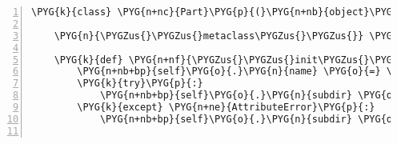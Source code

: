 \begin{Verbatim}[commandchars=\\\{\},numbers=left,firstnumber=1,stepnumber=5]
\PYG{k}{class} \PYG{n+nc}{Part}\PYG{p}{(}\PYG{n+nb}{object}\PYG{p}{)}\PYG{p}{:}

    \PYG{n}{\PYGZus{}\PYGZus{}metaclass\PYGZus{}\PYGZus{}} \PYG{o}{=} \PYG{n}{PartType}

    \PYG{k}{def} \PYG{n+nf}{\PYGZus{}\PYGZus{}init\PYGZus{}\PYGZus{}}\PYG{p}{(}\PYG{n+nb+bp}{self}\PYG{p}{)}\PYG{p}{:}
        \PYG{n+nb+bp}{self}\PYG{o}{.}\PYG{n}{name} \PYG{o}{=} \PYG{n+nb+bp}{self}\PYG{o}{.}\PYG{n}{\PYGZus{}\PYGZus{}class\PYGZus{}\PYGZus{}}\PYG{o}{.}\PYG{n}{\PYGZus{}\PYGZus{}name\PYGZus{}\PYGZus{}}
        \PYG{k}{try}\PYG{p}{:}
            \PYG{n+nb+bp}{self}\PYG{o}{.}\PYG{n}{subdir} \PYG{o}{=} \PYG{l+s}{"}\PYG{l+s}{src/}\PYG{l+s}{"} \PYG{o}{+} \PYG{n+nb+bp}{self}\PYG{o}{.}\PYG{n}{srcdir}
        \PYG{k}{except} \PYG{n+ne}{AttributeError}\PYG{p}{:}
            \PYG{n+nb+bp}{self}\PYG{o}{.}\PYG{n}{subdir} \PYG{o}{=} \PYG{l+s}{"}\PYG{l+s}{src/}\PYG{l+s}{"} \PYG{o}{+} \PYG{n+nb+bp}{self}\PYG{o}{.}\PYG{n}{name}


\end{Verbatim}
